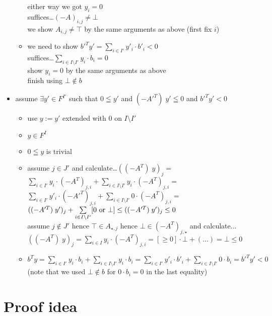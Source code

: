 \documentclass[]{article}
\begin{document}
\begin{itemize}
\begin{itemize}
either way we got $ y_i = 0 $ \\
suffices\dots $ (-A)_{i,j} \neq \bot $ \\
we show $ A_{i,j} \neq \top $ by the same arguments as above (first fix $i$)
\item we need to show $b'^T y' = \sum\limits_{i \in I'} y'_i \cdot b'_i < 0$ \\
suffices\dots $ \sum\limits_{i \in I \setminus I'} y_i \cdot b_i = 0 $ \\
show $y_i = 0$ by the same arguments as above \\
finish using $\bot \notin b$
\end{itemize}
\item assume $\exists y' \in F^{I'}$ such that $0 \leqq y'$ and $(-A'^T)\; y' \leqq 0$ and $b'^T y' < 0$
\begin{itemize}
\item use $y := y'$ extended with $0$ on $I \setminus I'$
\item $ y \in F^I $
\item $0 \leqq y$ is trivial
\item assume $j \in J'$ and calculate\dots $ ((-A^T)\; y)_j = $\\
$ \sum\limits_{i \in I'} y_i \cdot (-A^T)_{j,i} + \sum\limits_{i \in I \setminus I'} y_i \cdot (-A^T)_{j,i} = $\\
$ \sum\limits_{i \in I'} y'_i \cdot (-A'^T)_{j,i} + \sum\limits_{i \in I \setminus I'} 0 \cdot (-A^T)_{j,i} = $\\
$ ((-A'^T)\; y')_j + \sum\limits_{i \in I \setminus I'} [0 \textup{~or~} \bot] \le ((-A'^T)\; y')_j \le 0  $\\
assume $j \notin J'$ hence $\top \in A_{\star, j}$ hence $\bot \in (-A^T)_{j, \star}$ and calculate...
$ ((-A^T)\; y)_j = \sum\limits_{i \in I} y_i \cdot (-A^T)_{j,i} = [\ge 0] \cdot \bot + (\dots) = \bot \le 0 $
\item $ b^T y
= \sum\limits_{i \in I'} y_i \cdot b_i + \sum\limits_{i \in I \setminus I'} y_i \cdot b_i
= \sum\limits_{i \in I'} y'_i \cdot b'_i + \sum\limits_{i \in I \setminus I'} 0 \cdot b_i
= b'^T y' < 0 $
(note that we used $\bot \notin b$ for $0 \cdot b_i = 0$ in the last equality)
\end{itemize}
\end{itemize}

\section{Proof idea}
\end{document}
